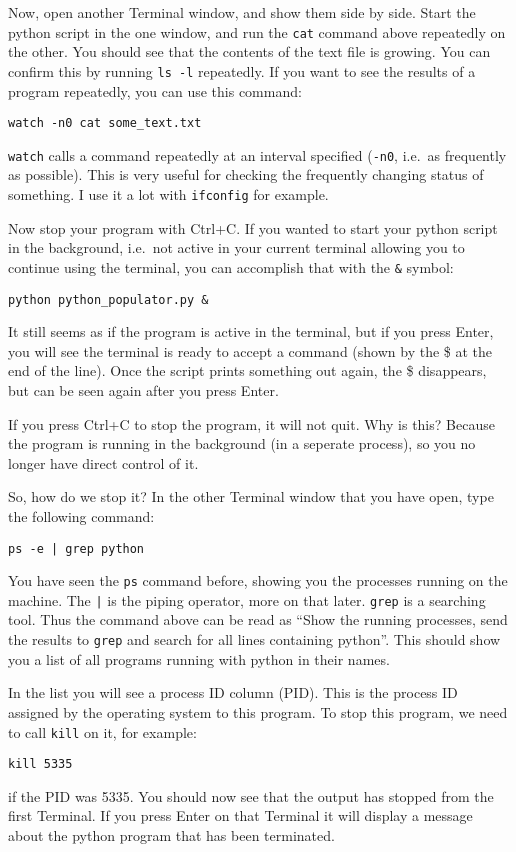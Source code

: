 \documentclass[a4paper]{article}
\begin{document}
Now, open another Terminal window, and show them side by side. Start the python script in the one window, and run the \texttt{cat} command above repeatedly on the other. You should see that the contents of the text file is growing. You can confirm this by running \texttt{ls -l} repeatedly. 
If you want to see the results of a program repeatedly, you can use this command: 
\begin{lstlisting}
watch -n0 cat some_text.txt
\end{lstlisting} 
\texttt{watch} calls a command repeatedly at an interval specified (\texttt {-n0}, i.e.\ as frequently as possible). This is very useful for checking the frequently changing status of something. I use it a lot with \texttt{ifconfig} for example. 

Now stop your program with Ctrl+C. If you wanted to start your python script in the background, i.e.\ not active in your current terminal allowing you to continue using the terminal, you can accomplish that with the \texttt{\&} symbol:
\begin{lstlisting}
python python_populator.py &
\end{lstlisting}

It still seems as if the program is active in the terminal, but if you press Enter, you will see the terminal is ready to accept a command (shown by the \$ at the end of the line). Once the script prints something out again, the \$ disappears, but can be seen again after you press Enter. 

If you press Ctrl+C to stop the program, it will not quit. Why is this? Because the program is running in the background (in a seperate process), so you no longer have direct control of it. 

So, how do we stop it? In the other Terminal window that you have open, type the following command: 
\begin{lstlisting}
ps -e | grep python
\end{lstlisting}
You have seen the \texttt{ps} command before, showing you the processes running on the machine. The \texttt{|} is the piping operator, more on that later. \texttt{grep} is a searching tool. Thus the command above can be read as ``Show the running processes, send the results to \texttt{grep} and search for all lines containing python''. This should show you a list of all programs running with python in their names. 

In the list you will see a process ID column (PID). This is the process ID assigned by the operating system to this program. To stop this program, we need to call \texttt{kill} on it, for example: 
\begin{lstlisting}
kill 5335
\end{lstlisting}
if the PID was 5335. You should now see that the output has stopped from the first Terminal. If you press Enter on that Terminal it will display a message about the python program that has been terminated. 
\end{document}
